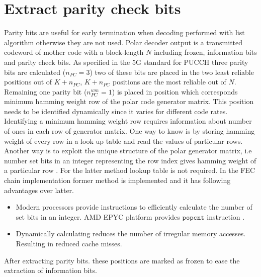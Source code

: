 \section{Extract parity check bits}
Parity bits are useful for early termination when decoding performed with list algorithm otherwise they are not used. Polar decoder output is a transmitted codeword of mother code with a block-length $N$ including frozen, information bits and parity check bits. As specified in the 5G standard \cite{3gpp.38.212} for PUCCH three parity bits are calculated ($n_{PC} = 3$) two of these bits are placed in the two least reliable positions out of $K+n_{PC}$, $K+n_{PC}$ positions are the most reliable out of $N$. Remaining one parity bit ($ n_{PC}^{wm} = 1 $) is placed in position which corresponds minimum hamming weight row of the polar code generator matrix. This position needs to be identified dynamically since it varies for different code rates. Identifying a minimum hamming weight row requires information about number of ones in each row of generator matrix. One way to know is by storing hamming weight of every row in a look up table and read the values of particular rows. Another way is to exploit the unique structure of the polar generator matrix, i.e number set bits in an integer representing the row index gives hamming weight of a particular row \cite{DesignOfPolarCodes5G}. For the latter method lookup table is not required. In the FEC chain implementation former method is implemented and it has following advantages over latter.

\begin{itemize}  
	\item Modern processors provide instructions to efficiently calculate the number of set bits in an integer. AMD EPYC platform provides $\mathtt{popcnt}$ instruction \cite{AgnerFog}.
	\item Dynamically calculating reduces the number of irregular memory accesses. Resulting in reduced cache misses.
\end{itemize}

After extracting parity bits. these positions are marked as frozen to ease the extraction of information bits.

